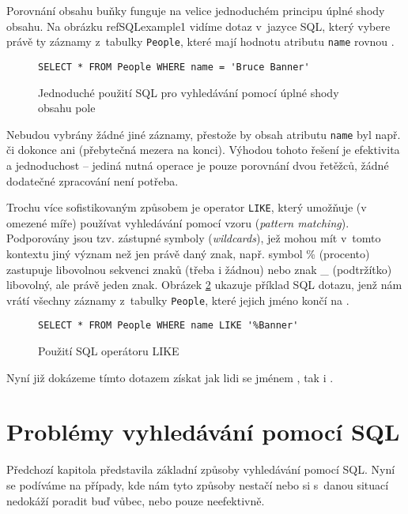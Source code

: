 \documentclass[11pt,oneside]{fithesis2}
\begin{document}
Porovnání obsahu buňky funguje na velice jednoduchém principu úplné shody obsahu. Na obrázku ref{SQLexample1} vidíme dotaz v~jazyce SQL, který vybere právě ty záznamy z~tabulky \texttt{People}, které mají hodnotu atributu \texttt{name} rovnou . 
\begin{figure}[!htbp]
\begin{lstlisting}[frame=single]
SELECT * FROM People WHERE name = 'Bruce Banner'
\end{lstlisting}
\caption{Jednoduché použití SQL pro vyhledávání pomocí úplné shody obsahu pole}
\label{SQLexample1}
\end{figure}

Nebudou vybrány žádné jiné záznamy, přestože by obsah atributu \texttt{name} byl např.  či dokonce ani  (přebytečná mezera na konci). Výhodou tohoto řešení je efektivita a jednoduchost -- jediná nutná operace je 
pouze porovnání dvou řetěžců, žádné dodatečné zpracování není potřeba. 

Trochu více sofistikovaným způsobem je operator \texttt{LIKE}, který umožňuje (v omezené míře) používat vyhledávání pomocí vzoru (\emph{pattern matching}). Podporovány jsou tzv. zástupné symboly (\emph{wildcards}), jež mohou mít v~tomto kontextu jiný význam než jen právě daný znak, např. symbol \% (procento) zastupuje libovolnou sekvenci znaků (třeba i žádnou) nebo znak \_ (podtržítko) libovolný, ale právě jeden znak. Obrázek \ref{SQLexample2} ukazuje příklad SQL dotazu, jenž nám vrátí všechny záznamy z~tabulky \texttt{People}, které jejich jméno končí na .
\begin{figure}[!htbp]
\begin{lstlisting}[frame=single]
SELECT * FROM People WHERE name LIKE '%Banner'
\end{lstlisting}
\caption{Použití SQL operátoru LIKE}
\label{SQLexample2}
\end{figure}

Nyní již dokázeme tímto dotazem získat jak lidi se jménem , tak i . 

\section{Problémy vyhledávání pomocí SQL}
Předchozí kapitola představila základní způsoby vyhledávání pomocí SQL. Nyní se podíváme na případy, kde nám tyto způsoby nestačí nebo si s~danou situací nedokáží poradit buď vůbec, nebo pouze neefektivně.
\end{document}
